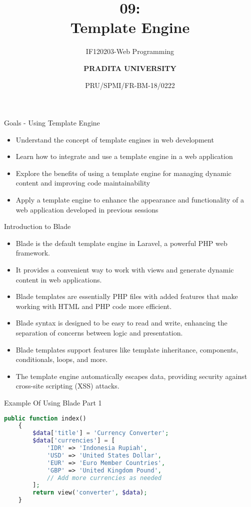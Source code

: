 \documentclass[aspectratio=169, table]{beamer}
\subtitle{IF120203-Web Programming}
\title{\Huge {\textbf{09: \\Template Engine}}}
\date[Serial]{\scriptsize {PRU/SPMI/FR-BM-18/0222}}
\author[Pradita]{\small {\textbf{PRADITA UNIVERSITY}}}
\begin{document}
\begin{frame}
    \titlepage
\end{frame}

\begin{frame}{Goals - Using Template Engine}
\begin{itemize}
	\item Understand the concept of template engines in web development
	\item Learn how to integrate and use a template engine in a web application
	\item Explore the benefits of using a template engine for managing dynamic content and improving code maintainability
	\item Apply a template engine to enhance the appearance and functionality of a web application developed in previous sessions
\end{itemize}
\end{frame}

\begin{frame}{Introduction to Blade}
\vskip1cm
\begin{itemize}
	\item Blade is the default template engine in Laravel, a powerful PHP web framework.
	\item It provides a convenient way to work with views and generate dynamic content in web applications.
	\item Blade templates are essentially PHP files with added features that make working with HTML and PHP code more efficient.
	\item Blade syntax is designed to be easy to read and write, enhancing the separation of concerns between logic and presentation.
	\item Blade templates support features like template inheritance, components, conditionals, loops, and more.
	\item The template engine automatically escapes data, providing security against cross-site scripting (XSS) attacks.
\end{itemize}
\end{frame}

\begin{frame}[fragile]{Example Of Using Blade Part 1}
    \begin{lstlisting}[language=PHP]
    public function index()
    {
        $data['title'] = 'Currency Converter';
        $data['currencies'] = [
            'IDR' => 'Indonesia Rupiah',
            'USD' => 'United States Dollar',
            'EUR' => 'Euro Member Countries',
            'GBP' => 'United Kingdom Pound',
            // Add more currencies as needed
        ];
        return view('converter', $data);
    }
    \end{lstlisting}
\end{frame}
\end{document}
